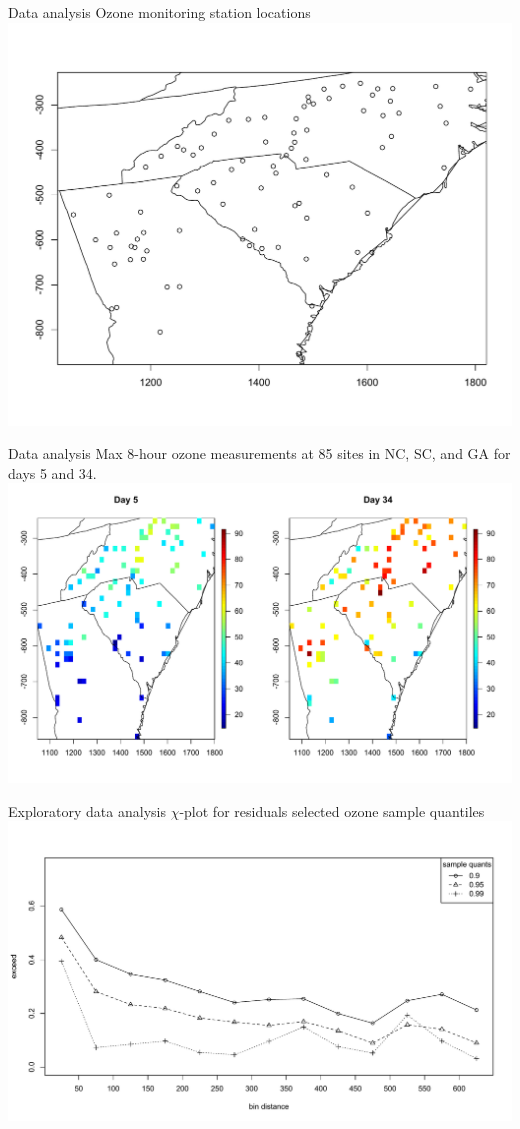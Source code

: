 \documentclass{beamer}
\begin{document}
\begin{frame}{Data analysis}
	\centering
	Ozone monitoring station locations
    \includegraphics[width=0.8\linewidth]{./plots/ozone_station.pdf}

\end{frame}

\begin{frame}{Data analysis}
  \centering
  Max 8-hour ozone measurements at 85 sites in NC, SC, and GA for days 5 and 34.
    \includegraphics[width=1\linewidth]{./plots/ozone-day.pdf}

\end{frame}

\begin{frame}{Exploratory data analysis}
	\centering
	$\chi$-plot for residuals selected ozone sample quantiles
    \includegraphics[width=1\linewidth]{./plots/chi-plot-ozone-res.pdf}
\end{frame}
\end{document}
